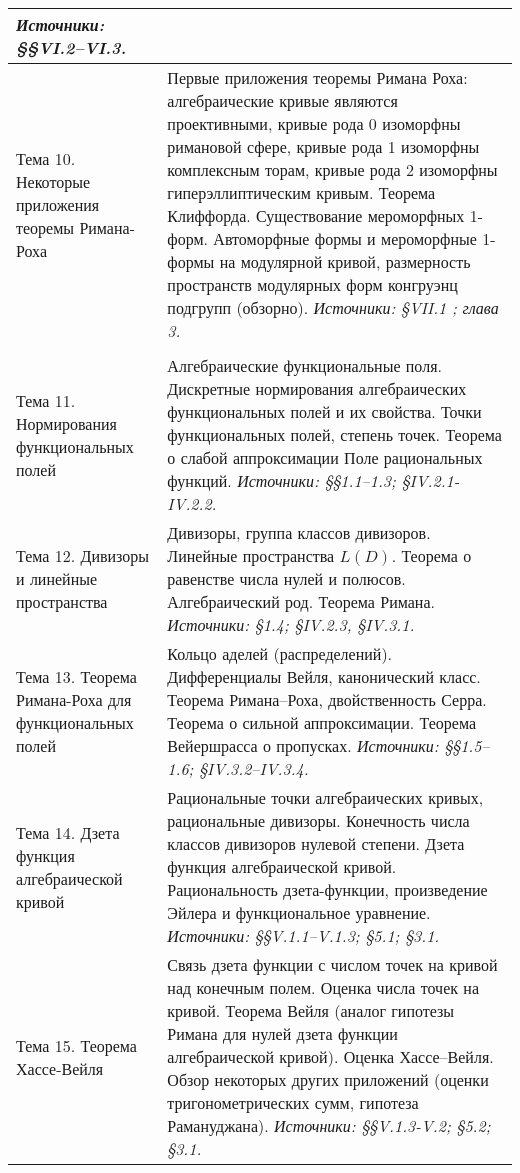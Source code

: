 \documentclass[a4paper, 12pt]{article}
\begin{document}
\begin{longtable}{ | >{\raggedright}p{5cm} | p{10cm} | }
    \textit{Источники: \cite{Mir} \S\S VI.2--VI.3.}\\ \hline
    Тема 10. Некоторые приложения теоремы Римана-Роха & Первые приложения теоремы Римана Роха: алгебраические кривые являются проективными, кривые рода 0 изоморфны римановой сфере, кривые рода 1 изоморфны комплексным торам, кривые рода 2 изоморфны гиперэллиптическим кривым. Теорема Клиффорда. Существование мероморфных 1-форм. Автоморфные формы и мероморфные 1-формы на модулярной кривой, размерность пространств модулярных форм конгруэнц подгрупп (обзорно).
    \textit{Источники: \cite{Mir} \S VII.1 ; \cite{DS} глава 3.}\\ \hline
    \multicolumn{2}{|l|}{\textit{Раздел 2. Алгебраические функциональные поля}}\\ \hline
    Тема 11. Нормирования функциональных полей & Алгебраические функциональные поля. Дискретные нормирования алгебраических функциональных полей и их свойства. Точки функциональных полей, степень точек. Теорема о слабой аппроксимации Поле рациональных функций.
    \textit{Источники: \cite{Stich} \S\S 1.1--1.3; \cite{Step} \S IV.2.1-IV.2.2.}\\ \hline
    Тема 12. Дивизоры и линейные пространства & Дивизоры, группа классов дивизоров. Линейные пространства $L(D)$. Теорема о равенстве числа нулей и полюсов. Алгебраический род. Теорема Римана.
    \textit{Источники: \cite{Stich} \S 1.4; \cite{Step} \S IV.2.3, \S IV.3.1.}\\ \hline
    Тема 13. Теорема Римана-Роха для функциональных полей & Кольцо аделей (распределений). Дифференциалы Вейля, канонический класс. Теорема Римана--Роха, двойственность Серра. Теорема о сильной аппроксимации. Теорема Вейершрасса о пропусках.
    \textit{Источники: \cite{Stich} \S\S 1.5--1.6; \cite{Step} \S IV.3.2--IV.3.4.}\\ \hline
    Тема 14. Дзета функция алгебраической кривой & Рациональные точки алгебраических кривых, рациональные дивизоры. Конечность числа классов дивизоров нулевой степени. Дзета функция алгебраической кривой. Рациональность дзета-функции, произведение Эйлера и функциональное уравнение.
    \textit{Источники: \cite{Step} \S\S V.1.1--V.1.3; \cite{Stich} \S 5.1; \cite{VNTs} \S 3.1.}\\ \hline
    Тема 15. Теорема Хассе-Вейля & Связь дзета функции с числом точек на кривой над конечным полем. Оценка числа точек на кривой. Теорема Вейля (аналог гипотезы Римана для нулей дзета функции алгебраической кривой). Оценка Хассе--Вейля. Обзор некоторых других приложений (оценки тригонометрических сумм, гипотеза Рамануджана).
    \textit{Источники: \cite{Step} \S\S V.1.3-V.2; \cite{Stich}  \S 5.2; \cite{VNTs} \S 3.1.}\\ \hline
\end{longtable}
\end{document}
